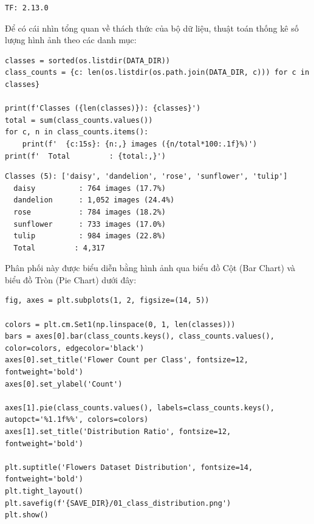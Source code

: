 \begin{lstlisting}[style=consoleoutput, caption={Output: Phiên bản TensorFlow}]
TF: 2.13.0
\end{lstlisting}

Để có cái nhìn tổng quan về thách thức của bộ dữ liệu, thuật toán thống kê số lượng hình ảnh theo các danh mục:

\begin{lstlisting}[style=pythoncode, caption={Đếm số lượng mẫu của từng loại hoa}]
classes = sorted(os.listdir(DATA_DIR))
class_counts = {c: len(os.listdir(os.path.join(DATA_DIR, c))) for c in classes}

print(f'Classes ({len(classes)}): {classes}')
total = sum(class_counts.values())
for c, n in class_counts.items():
    print(f'  {c:15s}: {n:,} images ({n/total*100:.1f}%)')
print(f'  Total         : {total:,}')
\end{lstlisting}

\begin{lstlisting}[style=consoleoutput, caption={Output: Chi tiết số lượng mẫu từng lớp}]
Classes (5): ['daisy', 'dandelion', 'rose', 'sunflower', 'tulip']
  daisy          : 764 images (17.7%)
  dandelion      : 1,052 images (24.4%)
  rose           : 784 images (18.2%)
  sunflower      : 733 images (17.0%)
  tulip          : 984 images (22.8%)
  Total         : 4,317
\end{lstlisting}

Phân phối này được biểu diễn bằng hình ảnh qua biểu đồ Cột (Bar Chart) và biểu đồ Tròn (Pie Chart) dưới đây:

\begin{lstlisting}[style=pythoncode, caption={Trực quan hóa phân phối Class}]
fig, axes = plt.subplots(1, 2, figsize=(14, 5))

colors = plt.cm.Set1(np.linspace(0, 1, len(classes)))
bars = axes[0].bar(class_counts.keys(), class_counts.values(), color=colors, edgecolor='black')
axes[0].set_title('Flower Count per Class', fontsize=12, fontweight='bold')
axes[0].set_ylabel('Count')

axes[1].pie(class_counts.values(), labels=class_counts.keys(), autopct='%1.1f%%', colors=colors)
axes[1].set_title('Distribution Ratio', fontsize=12, fontweight='bold')

plt.suptitle('Flowers Dataset Distribution', fontsize=14, fontweight='bold')
plt.tight_layout()
plt.savefig(f'{SAVE_DIR}/01_class_distribution.png')
plt.show()
\end{lstlisting}


